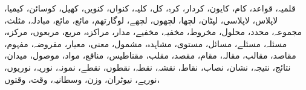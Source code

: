           قلمیہ،            قواعد،            کام،            کایون،            کردار،            کرہ،            کل،            کلیہ،            کنواں،            کنویں،            کھیل،            کوسائن،            کیمیا،            لاپلاس،            لاپلاسی،            لپٹان،            لچھا،            لچھوں،            لچھے،            لوگارتھم،            مائع،            مائع،            مبادلہ،            مثلث،            مجموعہ،            محدد،            محلول،            مخروط،            مخفیہ،            مخفیے،            مدار،            مراکزہ،            مربع،            مربعوں،            مرکزہ،            مسئلہ،            مسئلے،            مسائل،            مستوی،            مشاہدہ،            مشمول،            معنی،            معیار،            مفروضہ،            مفہوم،            مقاصد،            مقالب،            مقالہ،            مقام،            مقصد،            مقلب،            مقناطیس،            منافع،            مواد،            موصول،            میدان،            نتائج،            نتیجہ،            نشان،            نصاب،            نقاط،            نقشہ،            نقطہ،            نقطوں،            نقطے،            نمونہ،            نوریہ،            نوریوں،            نوریے،            نیوٹران،            وزن،            وسطانیہ،            وقت،            وقتوں،   

